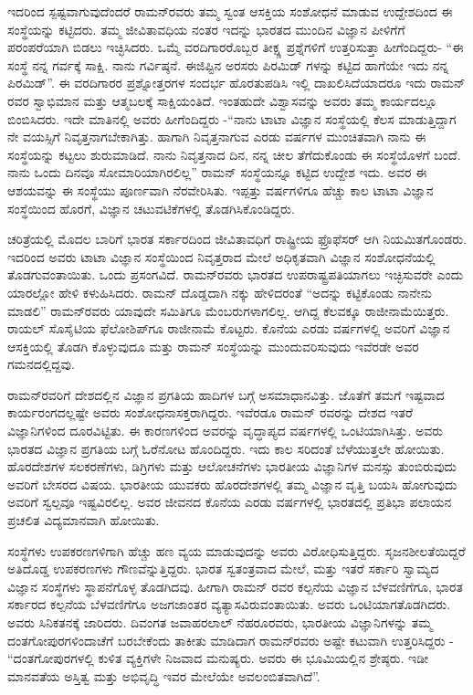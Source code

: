 ಇದರಿಂದ ಸ್ಪಷ್ಟವಾಗುವುದೆಂದರೆ ರಾಮನ್‍ರವರು ತಮ್ಮ ಸ್ವಂತ ಆಸಕ್ತಿಯ ಸಂಶೋಧನೆ ಮಾಡುವ ಉದ್ದೇಶದಿಂದ ಈ ಸಂಸ್ಥೆಯನ್ನು ಕಟ್ಟಿದರು. ತಮ್ಮ ಜೀವಿತಾವಧಿಯ ನಂತರ ಇದನ್ನು ಭಾರತದ ಮುಂದಿನ ವಿಜ್ಞಾನ ಪೀಳಿಗೆಗೆ ಪರಂಪರೆಯಾಗಿ ಬಿಡಲು ಇಚ್ಛಿಸಿದರು. ಒಮ್ಮೆ ವರದಿಗಾರರೊಬ್ಬರ ತೀಕ್ಷ್ಣ ಪ್ರಶ್ನೆಗಳಿಗೆ ಉತ್ತರಿಸುತ್ತಾ ಹೀಗೆಂದಿದ್ದರು- “ಈ ಸಂಸ್ಥೆ ನನ್ನ ಗರ್ವಕ್ಕೆ ಸಾಕ್ಷಿ. ನಾನು ಗರ್ವಿಷ್ಠನೆ. ಈಜಿಪ್ಟಿನ ಅರಸರು ಪಿರಮಿಡ್ ಗಳನ್ನು ಕಟ್ಟಿದ ಹಾಗೆಯೇ ಇದು ನನ್ನ ಪಿರಮಿಡ್”. ಈ ವರದಿಗಾರರ ಪ್ರಶ್ನೋತ್ತರಗಳ ಸಂದರ್ಭ ಹೊರತುಪಡಿಸಿ ಇಲ್ಲಿ ದಾಖಲಿಸಿದೆಯಾದರೂ ಇದು ರಾಮನ್ ರವರ ಸ್ವಾಭಿಮಾನ ಮತ್ತು ಆತ್ಮಬಲಕ್ಕೆ ಸಾಕ್ಷಿಯಂತಿದೆ. ಇಂತಹುದೇ ವಿಶ್ವಾಸವನ್ನು ಅವರು ತಮ್ಮ ಕಾರ್ಯದಲ್ಲೂ ಬಿಂಬಿಸಿದರು. ಇದೇ ಮಾತಿನಲ್ಲಿ ಅವರು ಹೀಗೆಂದಿದ್ದರು -“ನಾನು ಟಾಟಾ ವಿಜ್ಞಾನ ಸಂಸ್ಥೆಯಲ್ಲಿ ಕೆಲಸ ಮಾಡುತ್ತಿದ್ದಾಗ ನೇ ವಯಸ್ಸಿಗೆ ನಿವೃತ್ತನಾಗಬೇಕಾಗಿತ್ತು. ಹಾಗಾಗಿ ನಿವೃತ್ತನಾಗುವ ಎರಡು ವರ್ಷಗಳ ಮುಂಚಿತವಾಗಿ ನಾನು ಈ ಸಂಸ್ಥೆಯನ್ನು ಕಟ್ಟಲು ಶುರುಮಾಡಿದೆ. ನಾನು ನಿವೃತ್ತನಾದ ದಿನ, ನನ್ನ ಚೀಲ ತೆಗೆದುಕೊಂಡು ಈ ಸಂಸ್ಥೆಯೊಳಗೆ ಬಂದೆ. ನಾನು ಒಂದು ದಿನವೂ ಸೋಮಾರಿಯಾಗಿರಲಿಲ್ಲ” ರಾಮನ್ ಸಂಸ್ಥೆಯನ್ನೂ ಕಟ್ಟಿದ ಉದ್ದೇಶ ಇದು. ಅವರ ಈ ಆಶಯವನ್ನು ಈ ಸಂಸ್ಥೆಯು ಪೂರ್ಣವಾಗಿ ನೆರವೇರಿಸಿತು. ಇಪ್ಪತ್ತು ವರ್ಷಗಳಿಗೂ ಹೆಚ್ಚು ಕಾಲ ಟಾಟಾ ವಿಜ್ಞಾನ ಸಂಸ್ಥೆಯಿಂದ ಹೊರಗೆ, ವಿಜ್ಞಾನ ಚಟುವಟಿಕೆಗಳಲ್ಲಿ ತೊಡಗಿಸಿಕೊಂಡಿದ್ದರು.

ಚರಿತ್ರೆಯಲ್ಲಿ ಮೊದಲ ಬಾರಿಗೆ ಭಾರತ ಸರ್ಕಾರದಿಂದ ಜೀವಿತಾವಧಿಗೆ ರಾಷ್ಟ್ರೀಯ ಫ್ರೊಫೆಸರ್ ಆಗಿ ನಿಯಮಿತಗೊಂಡರು. ಇದರಿಂದ ಅವರು ಟಾಟಾ ವಿಜ್ಞಾನ ಸಂಸ್ಥೆಯಿಂದ ನಿವೃತ್ತರಾದ ಮೇಲೆ ಅಧಿಕೃತವಾಗಿ ವಿಜ್ಞಾನ ಸಂಶೋಧನೆಯಲ್ಲಿ ತೊಡಗುವಂತಾಯಿತು. ಒಂದು ಪ್ರಸಂಗವಿದೆ. ರಾಮನ್‍ರವರು ಭಾರತದ ಉಪರಾಷ್ಟ್ರಪತಿಯಾಗಲು ಇಚ್ಛಿಸುವರೇ ಎಂದು ಯಾರಲ್ಲೋ ಹೇಳಿ ಕಳುಹಿಸಿದರು. ರಾಮನ್ ದೊಡ್ಡದಾಗಿ ನಕ್ಕು ಹೇಳಿದರಂತೆ “ಅದನ್ನು ಕಟ್ಟಿಕೊಂಡು ನಾನೇನು ಮಾಡಲಿ” ರಾಮನ್‍ರವರು ಯಾವುದೇ ಸಮಿತಿಗೂ ಮೆಂಬರುಗಳಾಗಲಿಲ್ಲ. ಆಗಿದ್ದ ಕೆಲವಕ್ಕೂ ರಾಜೀನಾಮೆಯಿತ್ತರು. ರಾಯಲ್ ಸೊಸೈಟಿಯ ಫೆಲೋಶಿಪ್‍ಗೂ ರಾಜೀನಾಮೆ ಕೊಟ್ಟರು. ಕೊನೆಯ ಎರಡು ವರ್ಷಗಳಲ್ಲಿ ಅವರಿಗೆ ವಿಜ್ಞಾನ ಆಸಕ್ತಿಯಲ್ಲಿ ತೊಡಗಿ ಕೊಳ್ಳುವುದೂ ಮತ್ತು ರಾಮನ್ ಸಂಸ್ಥೆಯನ್ನು ಮುಂದುವರಿಸುವುದು ಇವೆರಡೇ ಅವರ ಗಮನದಲ್ಲಿದ್ದವು.



ರಾಮನ್‍ರವರಿಗೆ ದೇಶದಲ್ಲಿನ ವಿಜ್ಞಾನ ಪ್ರಗತಿಯ ಹಾದಿಗಳ ಬಗ್ಗೆ ಅಸಮಾಧಾನವಿತ್ತು. ಜೊತೆಗೆ ತಮಗೆ ಇಷ್ಟವಾದ ಕಾರ್ಯರಂಗದಲ್ಲಷ್ಟೇ ಅವರು ಸಂಶೋಧನಾಸಕ್ತರಾಗಿದ್ದರು. ಇವೆರಡೂ ರಾಮನ್ ರವರನ್ನು ದೇಶದ ಇತರೆ ವಿಜ್ಞಾನಿಗಳಿಂದ ದೂರವಿಟ್ಟಿತು. ಈ ಕಾರಣಗಳಿಂದ ಅವರನ್ನು ವೃದ್ಧಾಪ್ಯದ ವರ್ಷಗಳಲ್ಲಿ ಒಂಟಿಯಾಗಿಸಿತ್ತು. ಅವರು ಭಾರತದ ವಿಜ್ಞಾನ ಪ್ರಗತಿಯ ಬಗ್ಗೆ ಓರೆನೋಟ ಹೊಂದಿದ್ದರು. ಇದು ಕಾಲ ಸರಿದಂತೆ ಬೆಳೆಯುತ್ತಲೇ ಹೋಯಿತು. ಹೊರದೇಶಗಳ ಸಲಕರಣೆಗಳು, ಡಿಗ್ರಿಗಳು ಮತ್ತು ಆಲೋಚನೆಗಳು ಭಾರತೀಯ ವಿಜ್ಞಾನಿಗಳ ಮನಸ್ಸು ತುಂಬಿರುವುದು ಅವರಿಗೆ ಬೇಸರದ ವಿಷಯ. ಭಾರತೀಯ ಯುವಕರು ಹೊರದೇಶಗಳಲ್ಲಿ ತಮ್ಮ ವಿಜ್ಞಾನ ವೃತ್ತಿ ಬಯಸಿ ಹೋಗುವುದು ಅವರಿಗೆ ಸ್ವಲ್ಪವೂ ಇಷ್ಟವಿರಲಿಲ್ಲ. ಅವರ ಜೀವನದ ಕೊನೆಯ ಎರಡು ವರ್ಷಗಳಲ್ಲಿ ಭಾರತದಲ್ಲಿ ಪ್ರತಿಭಾ ಪಲಾಯನ ಪ್ರಚಲಿತ ವಿದ್ಯಮಾನವಾಗಿ ಹೋಯಿತು.

ಸಂಸ್ಥೆಗಳು ಉಪಕರಣಗಳಿಗಾಗಿ ಹೆಚ್ಚು ಹಣ ವ್ಯಯ ಮಾಡುವುದನ್ನು ಅವರು ವಿರೋಧಿಸುತ್ತಿದ್ದರು. ಸೃಜನಶೀಲತೆಯಿದ್ದರೆ ಅತಿದೊಡ್ಡ ಉಪಕರಣಗಳು ಗೌಣವೆನ್ನುತ್ತಿದ್ದರು. ಭಾರತ ಸ್ವತಂತ್ರವಾದ ಮೇಲೆ,  ಮತ್ತು ಇತರೆ ಸರ್ಕಾರಿ ಸ್ವಾಮ್ಯದ ವಿಜ್ಞಾನ ಸಂಸ್ಥೆಗಳು ಸ್ಥಾಪನೆಗೊಳ್ಳ ತೊಡಗಿದವು. ಹೀಗಾಗಿ ರಾಮನ್ ರವರ ಕಲ್ಪನೆಯ ವಿಜ್ಞಾನ ಬೆಳವಣಿಗೆಗೂ, ಭಾರತ ಸರ್ಕಾರದ ಕಲ್ಪನೆಯ ಬೆಳವಣಿಗೆಗೂ ಅಜಗಜಾಂತರ ವ್ಯತ್ಯಾಸವಿರುವಂತಾಯಿತು. ಅವರು ಒಂಟಿಯಾಗತೊಡಗಿದರು. ಅವರು ಸಿನಿಕತನಕ್ಕೆ ಜಾರಿದರು. ದಿವಂಗತ ಜವಾಹರಲಾಲ್ ನೆಹರೂರವರು, ಭಾರತೀಯ ವಿಜ್ಞಾನಿಗಳನ್ನು ತಮ್ಮ ದಂತಗೋಪುರಗಳಿಂದಾಚೆಗೆ ಬರಬೇಕೆಂದು ತಾಕೀತು ಮಾಡಿದಾಗ ರಾಮನ್‍ರವರು ಅಷ್ಟೇ ಕಟುವಾಗಿ ಉತ್ತರಿಸಿದ್ದರು - “ದಂತಗೋಪುರಗಳಲ್ಲಿ ಕುಳಿತ ವ್ಯಕ್ತಿಗಳೇ ನಿಜವಾದ ಮನುಷ್ಯರು. ಅವರು ಈ ಭೂಮಿಯಲ್ಲಿನ ಶ್ರೇಷ್ಠರು. ಇಡೀ ಮಾನವತೆಯ ಅಸ್ತಿತ್ವ ಮತ್ತು ಅಭಿವೃದ್ಧಿ ಇವರ ಮೇಲೆಯೇ ಅವಲಂಬಿತವಾಗಿದೆ”.

